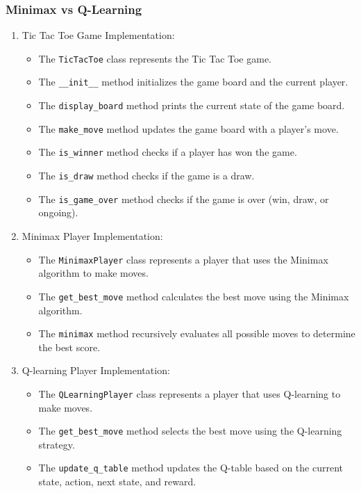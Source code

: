\documentclass{article}
\begin{document}
\subsubsection{Minimax vs Q-Learning}
\begin{enumerate}
  \item Tic Tac Toe Game Implementation:
    \begin{itemize}
      \item The \texttt{TicTacToe} class represents the Tic Tac Toe game.
      \item The \texttt{\_\_init\_\_} method initializes the game board and the current player.
      \item The \texttt{display\_board} method prints the current state of the game board.
      \item The \texttt{make\_move} method updates the game board with a player's move.
      \item The \texttt{is\_winner} method checks if a player has won the game.
      \item The \texttt{is\_draw} method checks if the game is a draw.
      \item The \texttt{is\_game\_over} method checks if the game is over (win, draw, or ongoing).
    \end{itemize}

  \item Minimax Player Implementation:
    \begin{itemize}
      \item The \texttt{MinimaxPlayer} class represents a player that uses the Minimax algorithm to make moves.
      \item The \texttt{get\_best\_move} method calculates the best move using the Minimax algorithm.
      \item The \texttt{minimax} method recursively evaluates all possible moves to determine the best score.
    \end{itemize}

  \item Q-learning Player Implementation:
    \begin{itemize}
      \item The \texttt{QLearningPlayer} class represents a player that uses Q-learning to make moves.
      \item The \texttt{get\_best\_move} method selects the best move using the Q-learning strategy.
      \item The \texttt{update\_q\_table} method updates the Q-table based on the current state, action, next state, and reward.
    \end{itemize}


\end{enumerate}
\end{document}
